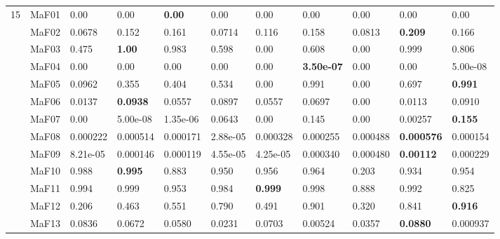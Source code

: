 \documentclass[]{article}
\begin{document}
\begin{landscape}
\begin{table}
\begin{footnotesize}
\begin{tabular}{|l|l|l|l|l|l|l|l|l|l|l|}
\multirow{15}{*}{15} & MaF01 & \cellcolor{gray95} 0.00 & \cellcolor{gray95} 0.00 & \cellcolor{gray95} {\bf 0.00} & \cellcolor{gray95} 0.00 & \cellcolor{gray95} 0.00 & \cellcolor{gray95} 0.00 & \cellcolor{gray95} 0.00 & \cellcolor{gray95} 0.00 & \cellcolor{gray95} 0.00\\
 & MaF02 & 0.0678 & 0.152 & \cellcolor{gray95} 0.161 & 0.0714 & 0.116 & 0.158 & 0.0813 & \cellcolor{gray95} {\bf 0.209} & \cellcolor{gray95} 0.166\\
 & MaF03 & 0.475 & \cellcolor{gray95} {\bf 1.00} & \cellcolor{gray95} 0.983 & 0.598 & 0.00 & 0.608 & 0.00 & \cellcolor{gray95} 0.999 & 0.806\\
 & MaF04 & \cellcolor{gray95} 0.00 & \cellcolor{gray95} 0.00 & \cellcolor{gray95} 0.00 & \cellcolor{gray95} 0.00 & \cellcolor{gray95} 0.00 & \cellcolor{gray95} {\bf 3.50e-07} & \cellcolor{gray95} 0.00 & \cellcolor{gray95} 0.00 & \cellcolor{gray95} 5.00e-08\\
 & MaF05 & 0.0962 & 0.355 & 0.404 & \cellcolor{gray95} 0.534 & 0.00 & \cellcolor{gray95} 0.991 & 0.00 & \cellcolor{gray95} 0.697 & \cellcolor{gray95} {\bf 0.991}\\
 & MaF06 & 0.0137 & \cellcolor{gray95} {\bf 0.0938} & 0.0557 & \cellcolor{gray95} 0.0897 & 0.0557 & 0.0697 & 0.00 & 0.0113 & \cellcolor{gray95} 0.0910\\
 & MaF07 & 0.00 & 5.00e-08 & 1.35e-06 & \cellcolor{gray95} 0.0643 & 0.00 & \cellcolor{gray95} 0.145 & 0.00 & 0.00257 & \cellcolor{gray95} {\bf 0.155}\\
 & MaF08 & 0.000222 & \cellcolor{gray95} 0.000514 & 0.000171 & 2.88e-05 & 0.000328 & 0.000255 & \cellcolor{gray95} 0.000488 & \cellcolor{gray95} {\bf 0.000576} & 0.000154\\
 & MaF09 & 8.21e-05 & 0.000146 & 0.000119 & 4.55e-05 & 4.25e-05 & \cellcolor{gray95} 0.000340 & \cellcolor{gray95} 0.000480 & \cellcolor{gray95} {\bf 0.00112} & 0.000229\\
 & MaF10 & \cellcolor{gray95} 0.988 & \cellcolor{gray95} {\bf 0.995} & 0.883 & 0.950 & 0.956 & \cellcolor{gray95} 0.964 & 0.203 & 0.934 & 0.954\\
 & MaF11 & \cellcolor{gray95} 0.994 & \cellcolor{gray95} 0.999 & 0.953 & 0.984 & \cellcolor{gray95} {\bf 0.999} & \cellcolor{gray95} 0.998 & 0.888 & 0.992 & 0.825\\
 & MaF12 & 0.206 & 0.463 & 0.551 & \cellcolor{gray95} 0.790 & 0.491 & \cellcolor{gray95} 0.901 & 0.320 & \cellcolor{gray95} 0.841 & \cellcolor{gray95} {\bf 0.916}\\
 & MaF13 & \cellcolor{gray95} 0.0836 & 0.0672 & 0.0580 & 0.0231 & \cellcolor{gray95} 0.0703 & 0.00524 & 0.0357 & \cellcolor{gray95} {\bf 0.0880} & 0.000937\\

\end{tabular}
\end{footnotesize}
\end{table}
\end{landscape}
\end{document}
